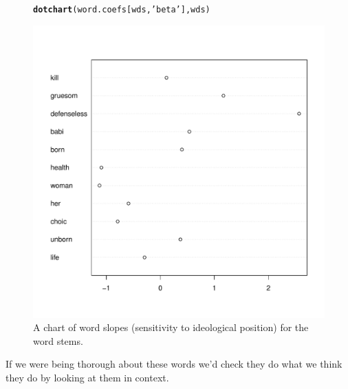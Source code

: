 \documentclass[10pt,a4paper]{article}\usepackage[]{graphicx}\usepackage[]{color}
\makeatletter
\def\maxwidth{ %
  \ifdim\Gin@nat@width>\linewidth
    \linewidth
  \else
    \Gin@nat@width
  \fi
}
\newcommand{\hlstr}[1]{\textcolor[rgb]{0.192,0.494,0.8}{#1}}%
\newcommand{\hlstd}[1]{\textcolor[rgb]{0.345,0.345,0.345}{#1}}%
\newcommand{\hlkwd}[1]{\textcolor[rgb]{0.737,0.353,0.396}{\textbf{#1}}}%
\newenvironment{kframe}{%
 \def\at@end@of@kframe{}%
 \ifinner\ifhmode%
  \def\at@end@of@kframe{\end{minipage}}%
  \begin{minipage}{\columnwidth}%
 \fi\fi%
 \def\FrameCommand##1{\hskip\@totalleftmargin \hskip-\fboxsep
 \colorbox{shadecolor}{##1}\hskip-\fboxsep
     \hskip-\linewidth \hskip-\@totalleftmargin \hskip\columnwidth}%
 \MakeFramed {\advance\hsize-\width
   \@totalleftmargin\z@ \linewidth\hsize
   \@setminipage}}%
 {\par\unskip\endMakeFramed%
 \at@end@of@kframe}
\newenvironment{knitrout}{}{} %
\makeatother
\begin{document}
\begin{figure}[htbp]
\begin{center}
\begin{knitrout}
\color{fgcolor}\begin{kframe}
\begin{alltt}
\hlkwd{dotchart}\hlstd{(word.coefs[wds,} \hlstr{'beta'}\hlstd{], wds)}
\end{alltt}
\end{kframe}
\includegraphics[width=\maxwidth]{figure/plot-words-again-1} 

\end{knitrout}
\caption{A chart of word slopes (sensitivity to ideological position) for the word stems.}
\label{wds}
\end{center}
\end{figure}

If we were being thorough about these words we'd check they do what we think they do by looking 
at them in context.


\end{document}

